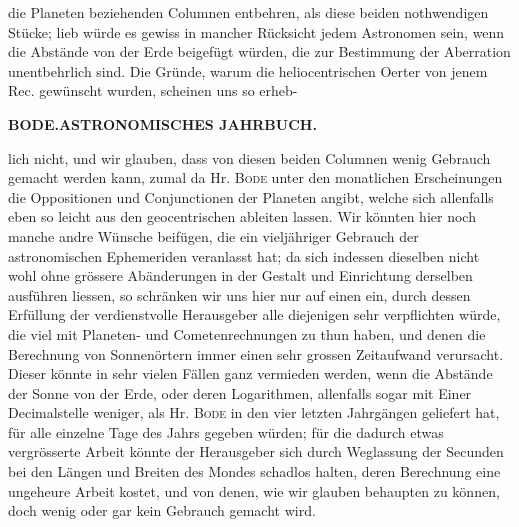 die Planeten beziehenden Columnen entbehren, als diese beiden nothwendigen Stücke; lieb würde es gewiss in mancher Rücksicht jedem Astronomen sein, wenn die Abstände von der Erde beigefügt würden, die zur Bestimmung der Aberration unentbehrlich sind. Die Gründe, warum die heliocentrischen Oerter von jenem Rec. gewünscht wurden, scheinen uns so erheb-\par
\clearpage
\thispagestyle{empty}
\noindent{}%
\makebox[12mm][l]{}%
\parbox[t]{\dimexpr\linewidth-24mm\relax}{\centering\footnotesize\bfseries BODE.\enspace ASTRONOMISCHES JAHRBUCH.\par}%
\par\nobreak\medskip
\noindent lich nicht, und wir glauben, dass von diesen beiden Columnen wenig Gebrauch gemacht werden kann, zumal da Hr. \textsc{Bode} unter den monatlichen Erscheinungen die Oppositionen und Conjunctionen der Planeten angibt, welche sich allenfalls eben so leicht aus den geocentrischen ableiten lassen. Wir könnten hier noch manche andre Wünsche beifügen, die ein vieljähriger Gebrauch der astronomischen Ephemeriden veranlasst hat; da sich indessen dieselben nicht wohl ohne grössere Abänderungen in der Gestalt und Einrichtung derselben ausführen liessen, so schränken wir uns hier nur auf einen ein, durch dessen Erfüllung der verdienstvolle Herausgeber alle diejenigen sehr verpflichten würde, die viel mit Planeten- und Cometenrechnungen zu thun haben, und denen die Berechnung von Sonnenörtern immer einen sehr grossen Zeitaufwand verursacht. Dieser könnte in sehr vielen Fällen ganz vermieden werden, wenn die Abstände der Sonne von der Erde, oder deren Logarithmen, allenfalls sogar mit Einer Decimalstelle weniger, als Hr. \textsc{Bode} in den vier letzten Jahrgängen geliefert hat, für alle einzelne Tage des Jahrs gegeben würden; für die dadurch etwas vergrösserte Arbeit könnte der Herausgeber sich durch Weglassung der Secunden bei den Längen und Breiten des Mondes schadlos halten, deren Berechnung eine ungeheure Arbeit kostet, und von denen, wie wir glauben behaupten zu können, doch wenig oder gar kein Gebrauch gemacht wird.

